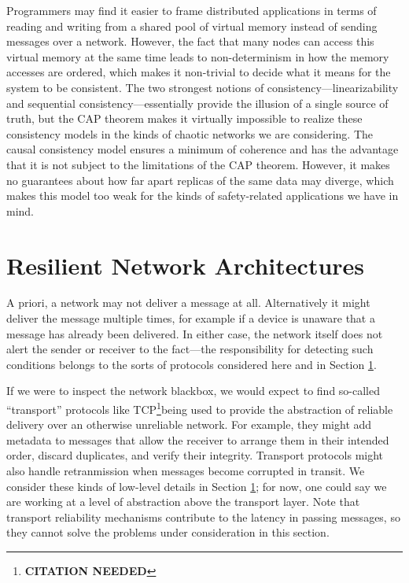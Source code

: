 \documentclass[]             %
{NASA}                       %
\theoremstyle{definition}
\newcommand{\citationneeded}{\footnote{\textbf{CITATION NEEDED}}}
\begin{document}
Programmers may find it easier to frame distributed applications in
terms of reading and writing from a shared pool of virtual memory
instead of sending messages over a network. However, the fact that
many nodes can access this virtual memory at the same time leads to
non-determinism in how the memory accesses are ordered, which makes it
non-trivial to decide what it means for the system to be
consistent. The two strongest notions of consistency---linearizability
and sequential consistency---essentially provide the illusion of a
single source of truth, but the CAP theorem makes it virtually
impossible to realize these consistency models in the kinds of chaotic
networks we are considering. The causal consistency model ensures a
minimum of coherence and has the advantage that it is not subject to
the limitations of the CAP theorem. However, it makes no guarantees
about how far apart replicas of the same data may diverge, which makes
this model too weak for the kinds of safety-related applications we
have in mind.

\section{Resilient Network Architectures}
\label{sec:networking}



A priori, a network may not deliver a message at all. Alternatively it
might deliver the message multiple times, for example if a device is
unaware that a message has already been delivered. In either case, the
network itself does not alert the sender or receiver to the fact---the
responsibility for detecting such conditions belongs to the sorts of
protocols considered here and in Section \ref{sec:networking}.

If we were to inspect the network blackbox, we would expect to find
so-called ``transport'' protocols like TCP\citationneeded being used
to provide the abstraction of reliable delivery over an otherwise
unreliable network. For example, they might add metadata to messages
that allow the receiver to arrange them in their intended order,
discard duplicates, and verify their integrity. Transport protocols
might also handle retranmission when messages become corrupted in
transit. We consider these kinds of low-level details in Section
\ref{sec:networking}; for now, one could say we are working at a level
of abstraction above the transport layer. Note that transport
reliability mechanisms contribute to the latency in passing messages,
so they cannot solve the problems under consideration in this section.
\end{document}
